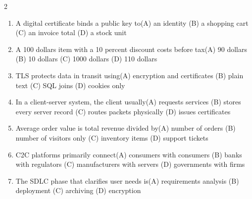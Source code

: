 \documentclass[a4paper]{article}
\begin{document}
\begin{multicols*}{2}
\begin{enumerate}
\item A digital certificate binds a public key to\newline\hspace*{0.6em}(A) an identity \quad (B) a shopping cart \newline\hspace*{0.6em}(C) an invoice total \quad (D) a stock unit
\item A 100 dollars item with a 10 percent discount costs before tax\newline\hspace*{0.6em}(A) 90 dollars \quad (B) 10 dollars \newline\hspace*{0.6em}(C) 1000 dollars \quad (D) 110 dollars
\item TLS protects data in transit using\newline\hspace*{0.6em}(A) encryption and certificates \quad (B) plain text \newline\hspace*{0.6em}(C) SQL joins \quad (D) cookies only
\item In a client-server system, the client usually\newline\hspace*{0.6em}(A) requests services \quad (B) stores every server record \newline\hspace*{0.6em}(C) routes packets physically \quad (D) issues certificates
\item Average order value is total revenue divided by\newline\hspace*{0.6em}(A) number of orders \quad (B) number of visitors only \newline\hspace*{0.6em}(C) inventory items \quad (D) support tickets
\item C2C platforms primarily connect\newline\hspace*{0.6em}(A) consumers with consumers \quad (B) banks with regulators \newline\hspace*{0.6em}(C) manufacturers with servers \quad (D) governments with firms
\item The SDLC phase that clarifies user needs is\newline\hspace*{0.6em}(A) requirements analysis \quad (B) deployment \newline\hspace*{0.6em}(C) archiving \quad (D) encryption

\end{enumerate}
\end{multicols*}
\end{document}
